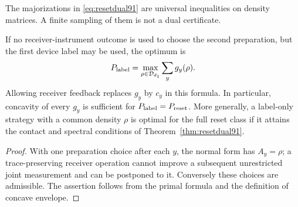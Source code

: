 The majorizations in \eqref{eq:resetdual91} are universal inequalities
on density matrices.  A finite sampling of them is not a dual certificate.

\begin{corollary}\label{cor:feedbackroof91}
If no receiver-instrument outcome is used to choose the second
preparation, but the first device label may be used, the optimum is
\[
 P_{\rm label}=\max_{\rho\in\mathcal D_{d_1}}\sum_yg_y(\rho).
\]
Allowing receiver feedback replaces $g_y$ by $c_y$ in this formula.
In particular, concavity of every $g_y$ is sufficient for
$P_{\rm label}=P_{\rm reset}$.  More generally, a label-only strategy
with a common density $\rho$ is optimal for the full reset class if
it attains the contact and spectral conditions of
Theorem~\ref{thm:resetdual91}.
\end{corollary}
\begin{proof}
With one preparation choice after each $y$, the normal form has
$A_y=\rho$; a trace-preserving receiver operation cannot improve a
subsequent unrestricted joint measurement and can be postponed to it.
Conversely these choices are admissible.  The assertion follows from
the primal formula and the definition of concave envelope.
\end{proof}

